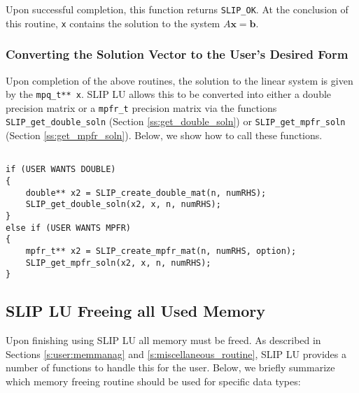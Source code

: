 \documentclass[12pt]{article}
\theoremstyle{definition}
\begin{document}
Upon successful completion, this function returns \verb|SLIP_OK|. At the conclusion of this routine, \verb|x| contains the solution to the system $A \mathbf{x} = \mathbf{b}$.

\subsubsection{Converting the Solution Vector to the User's Desired Form}

Upon completion of the above routines, the solution to the linear system is given by the \verb|mpq_t** x|. SLIP LU allows this to be converted into either a double precision matrix or a \verb|mpfr_t| precision matrix via the functions \verb|SLIP_get_double_soln| (Section \ref{ss:get_double_soln}) or \verb|SLIP_get_mpfr_soln| (Section \ref{ss:get_mpfr_soln}). Below, we show how to call these functions.

\begin{verbatim}

if (USER WANTS DOUBLE)
{
    double** x2 = SLIP_create_double_mat(n, numRHS);
    SLIP_get_double_soln(x2, x, n, numRHS);
}
else if (USER WANTS MPFR)
{
    mpfr_t** x2 = SLIP_create_mpfr_mat(n, numRHS, option);
    SLIP_get_mpfr_soln(x2, x, n, numRHS);
}

\end{verbatim}


\cprotect\subsection{SLIP LU Freeing all Used Memory} \label{s:Using:free}

Upon finishing using SLIP LU all memory must be freed. As described in Sections \ref{s:user:memmanag} and \ref{s:miscellaneous_routine}, SLIP LU provides a number of functions to handle this for the user. Below, we briefly summarize which memory freeing routine should be used for specific data types:
\end{document}
